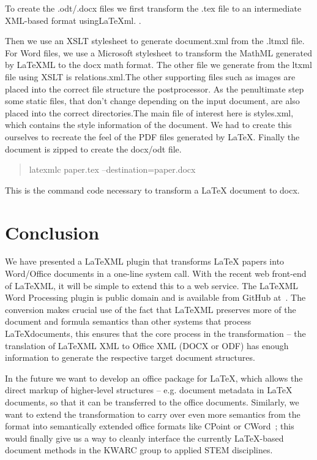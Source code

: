 \documentclass{llncs}
\def\latexml{{\LaTeX}ML\xspace}
\begin{document}
To create the .odt/.docx files we first transform the .tex file to an intermediate
XML-based format using{\LaTeX}ml. .

Then we use an XSLT stylesheet to generate document.xml from the .ltmxl file. For Word files, we use a Microsoft stylesheet to transform the MathML generated by {\LaTeX}ML to the docx math format. The other file we generate from the ltxml file using XSLT is relations.xml.The other supporting files such as images are placed into the correct file structure the postprocessor. As the penultimate step some static files, that don't change depending on the input document, are also placed into the correct directories.The main file of interest here is styles.xml, which contains the style information of the document. We had to create this ourselves to recreate the feel of the PDF files generated by {\LaTeX}. Finally the document is zipped to create the docx/odt file. \\ 
\begin{quote}
latexmlc paper.tex --destination=paper.docx
\end{quote}
This is the command code necessary to transform a {\LaTeX} document to docx. 

\section{Conclusion}\label{sec:concl}
We have presented a \latexml plugin that transforms {\LaTeX} papers into Word/Office
documents in a one-line system call. With the recent web front-end of \latexml, it will be
simple to extend this to a web service. The \latexml Word Processing plugin is public
domain and is available from GitHub at~\cite{LaTeX2Office:github:on}. The conversion makes
crucial use of the fact that \latexml preserves more of the document and formula semantics
than other systems that process \LaTeX documents, this ensures that the core process in
the transformation -- the translation of \latexml XML to Office XML (DOCX or ODF) has
enough information to generate the respective target document structures.

In the future we want to develop an office package for \LaTeX, which allows the direct
markup of higher-level structures -- e.g. document metadata in {\LaTeX} documents, so that
it can be transferred to the office documents. Similarly, we want to extend the
transformation to carry over even more semantics from the \stex format into semantically
extended office formats like CPoint or
CWord~\cite{Kohlhase:SemanticInteractionDesignDiss:biblatex}; this would finally give us a
way to cleanly interface the currently {\LaTeX}-based document methods in the KWARC group
to applied STEM disciplines.

\printbibliography
\end{document}
